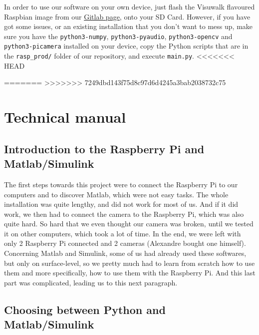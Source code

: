 \documentclass{rapport}
\begin{document}
In order to use our software on your own device, just flash the Visuwalk flavoured Raspbian image from our \href{https://gitlab.eurecom.fr/algh2/visuwalk/-/releases}{Gitlab page}, onto your SD Card. However, if you have got some issues, or an existing installation that you don't want to mess up, make sure you have the \verb|python3-numpy|, \verb|python3-pyaudio|, \verb|python3-opencv| and \verb|python3-picamera| installed on your device, copy the Python scripts that are in the \verb|rasp_prod/| folder of our repository, and execute \verb|main.py|.
<<<<<<< HEAD

=======
>>>>>>> 7249dbd143f75d8c97d6d4245a3bab2038732c75

\section{Technical manual}

\subsection{Introduction to the Raspberry Pi and Matlab/Simulink
}
    
The first steps towards this project were to connect the Raspberry Pi to our computers and to discover Matlab, which were not easy tasks.
The whole installation was quite lengthy, and did not work for most of us. And if it did work, we then had to connect the camera to the Raspberry Pi, which was also quite hard. So hard that we even thought our camera was broken, until we tested it on other computers, which took a lot of time. In the end, we were left with only 2 Raspberry Pi connected and 2 cameras (Alexandre bought one himself).\\
Concerning Matlab and Simulink, some of us had already used these softwares, but only on surface-level, so we pretty much had to learn from scratch how to use them and more specifically, how to use them with the Raspberry Pi. And this last part was complicated, leading us to this next paragraph.

\subsection{Choosing between Python and Matlab/Simulink
}
\end{document}
